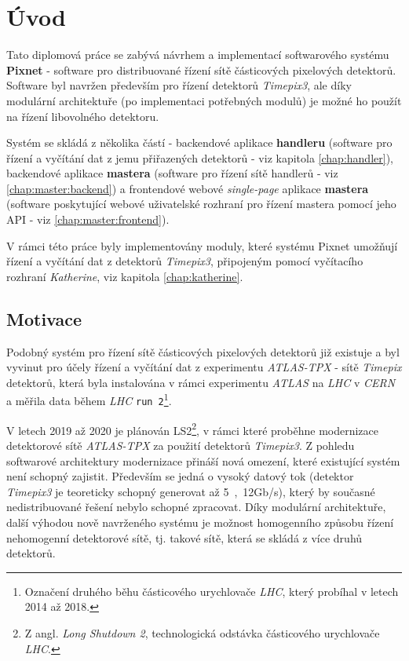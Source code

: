

\chapter{Úvod}\label{chap01} 
Tato diplomová práce se zabývá návrhem a implementací softwarového systému \textbf{Pixnet} - software pro distribuované řízení sítě částicových pixelových detektorů. Software byl navržen především pro řízení detektorů \textit{Timepix3}, ale díky modulární architektuře (po implementaci potřebných modulů) je možné ho použít na řízení libovolného detektoru.

Systém se skládá z několika částí - backendové aplikace \textbf{handleru} (software pro řízení a vyčítání dat z jemu přiřazených detektorů - viz kapitola \ref{chap:handler}), backendové aplikace \textbf{mastera} (software pro řízení sítě handlerů - viz \ref{chap:master:backend}) a frontendové webové \textit{single-page} aplikace \textbf{mastera} (software poskytující webové uživatelské rozhraní pro řízení mastera pomocí jeho API - viz \ref{chap:master:frontend}).

V rámci této práce byly implementovány moduly, které systému Pixnet umožňují řízení a vyčítání dat z detektorů \textit{Timepix3}, připojeným pomocí vyčítacího rozhraní \textit{Katherine}, viz kapitola \ref{chap:katherine}.

\section{Motivace}
Podobný systém pro řízení sítě částicových pixelových detektorů již existuje \cite{atlastpx_sw,BegeraBcThesis2016} a byl vyvinut pro účely řízení a vyčítání dat z experimentu \textit{ATLAS-TPX} - sítě \textit{Timepix} detektorů, která byla instalována v rámci experimentu \textit{ATLAS} na \textit{LHC} v \textit{CERN} a měřila data během \textit{LHC} \texttt{run 2}\footnote{Označení druhého běhu částicového urychlovače \textit{LHC}, který probíhal v letech 2014 až 2018.}. 

V letech 2019 až 2020 je plánován LS2\footnote{Z angl. \textit{Long Shutdown 2}, technologická odstávka částicového urychlovače \textit{LHC}.}, v rámci které proběhne modernizace detektorové sítě \textit{ATLAS-TPX} za použití detektorů \textit{Timepix3}. Z pohledu softwarové architektury modernizace přináší nová omezení, které existující systém není schopný zajistit. Především se jedná o vysoký datový tok (detektor \textit{Timepix3} je teoreticky schopný generovat až \unit{5,12}{Gb/s}), který by současné nedistribuované řešení nebylo schopné zpracovat. Díky modulární architektuře, další výhodou nově navrženého systému je možnost homogenního způsobu řízení nehomogenní detektorové sítě, tj. takové sítě, která se skládá z více druhů detektorů.

